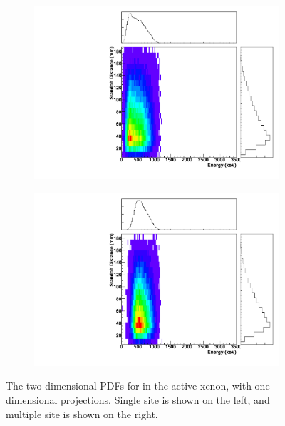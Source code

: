 \documentclass[herrin-thesis.tex]{subfiles}
\begin{document}
\begin{figure}[hp]
\centering
	\begin{subfigure}[b]{0.35\textwidth}
	\centering
	\includegraphics[width=\textwidth]{./plots/PDFs/analysis_pdf_ActiveLXe_Xe135_ss.pdf}
\end{subfigure}\hspace{0.1\textwidth}%
\begin{subfigure}[b]{0.35\textwidth}
	\centering
	\includegraphics[width=1\textwidth]{./plots/PDFs/analysis_pdf_ActiveLXe_Xe135_ms.pdf}
	\end{subfigure}
\caption[PDF for  in the active xenon]{The two dimensional PDFs for  in the active xenon, with one-dimensional projections. Single site is shown on the left, and multiple site is shown on the right.}
\label{fig:analysis_pdf_ActiveLXe_Xe135}
\end{figure}
\end{document}
